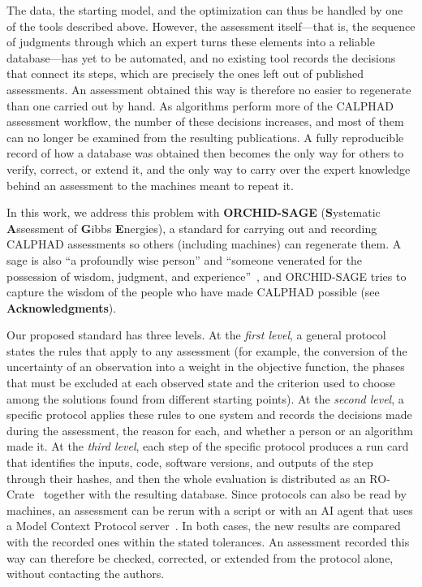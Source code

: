The data, the starting model, and the optimization can thus be handled by one of the tools described above. However, the assessment itself---that is, the sequence of judgments through which an expert turns these elements into a reliable database---has yet to be automated, and no existing tool records the decisions that connect its steps, which are precisely the ones left out of published assessments. An assessment obtained this way is therefore no easier to regenerate than one carried out by hand. As algorithms perform more of the CALPHAD assessment workflow, the number of these decisions increases, and most of them can no longer be examined from the resulting publications. A fully reproducible record of how a database was obtained then becomes the only way for others to verify, correct, or extend it, and the only way to carry over the expert knowledge behind an assessment to the machines meant to repeat it.

In this work, we address this problem with \textbf{ORCHID-SAGE} (\textbf{S}ystematic \textbf{A}ssessment of \textbf{G}ibbs \textbf{E}nergies), a standard for carrying out and recording CALPHAD assessments so others (including machines) can regenerate them. A sage is also ``a profoundly wise person'' and ``someone venerated for the possession of wisdom, judgment, and experience''~\cite{dictionarycom_sage}, and ORCHID-SAGE tries to capture the wisdom of the people who have made CALPHAD possible (see \textbf{Acknowledgments}). 

Our proposed standard has three levels. At the \emph{first level}, a general protocol states the rules that apply to any assessment (for example, the conversion of the uncertainty of an observation into a weight in the objective function, the phases that must be excluded at each observed state and the criterion used to choose among the solutions found from different starting points). At the \emph{second level}, a specific protocol applies these rules to one system and records the decisions made during the assessment, the reason for each, and whether a person or an algorithm made it. At the \emph{third level}, each step of the specific protocol produces a run card that identifies the inputs, code, software versions, and outputs of the step through their hashes, and then the whole evaluation is distributed as an RO-Crate~\cite{soilandreyes2022rocrate,leo2024wrroc} together with the resulting database. Since protocols can also be read by machines, an assessment can be rerun with a script or with an AI agent that uses a Model Context Protocol server~\cite{mcp}. In both cases, the new results are compared with the recorded ones within the stated tolerances. An assessment recorded this way can therefore be checked, corrected, or extended from the protocol alone, without contacting the authors.

